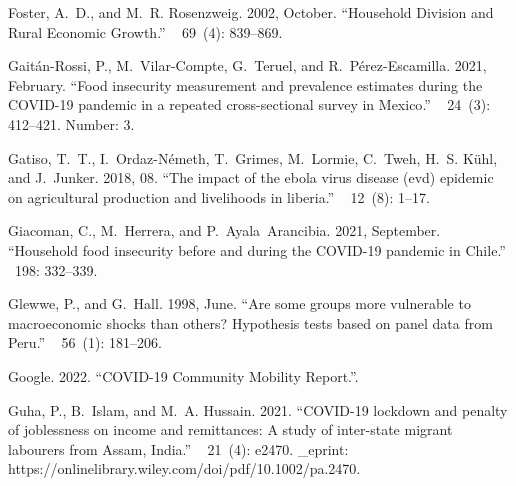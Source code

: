 \documentclass{wber}
\begin{document}
\begin{thebibliography}{}
Foster, A.~D., and M.~R. Rosenzweig. 2002, October.
\newblock ``Household {Division} and {Rural} {Economic} {Growth}.''
~{ 69\/}~(4): 839--869.

Gait{\'a}n-Rossi, P., M.~Vilar-Compte, G.~Teruel, and R.~P{\'e}rez-Escamilla.
  2021, February.
\newblock ``Food insecurity measurement and prevalence estimates during the
  {COVID}-19 pandemic in a repeated cross-sectional survey in {Mexico}.''
~{ 24\/}~(3): 412--421.
\newblock Number: 3.

Gatiso, T.~T., I.~Ordaz-N{\'e}meth, T.~Grimes, M.~Lormie, C.~Tweh, H.~S.
  K{\"u}hl, and J.~Junker. 2018, 08.
\newblock ``The impact of the ebola virus disease (evd) epidemic on
  agricultural production and livelihoods in liberia.''
~{ 12\/}~(8): 1--17.

Giacoman, C., M.~Herrera, and P.~Ayala~Arancibia. 2021, September.
\newblock ``Household food insecurity before and during the {COVID}-19 pandemic
  in {Chile}.''
~{198}: 332--339.

Glewwe, P., and G.~Hall. 1998, June.
\newblock ``Are some groups more vulnerable to macroeconomic shocks than
  others? {Hypothesis} tests based on panel data from {Peru}.''
~{ 56\/}~(1): 181--206.

Google. 2022.
\newblock ``{COVID}-19 {Community} {Mobility} {Report}.''.

Guha, P., B.~Islam, and M.~A. Hussain. 2021.
\newblock ``{COVID}-19 lockdown and penalty of joblessness on income and
  remittances: {A} study of inter-state migrant labourers from {Assam},
  {India}.''
~{ 21\/}~(4): e2470.
\newblock \_eprint: https://onlinelibrary.wiley.com/doi/pdf/10.1002/pa.2470.


\end{thebibliography}
\end{document}
